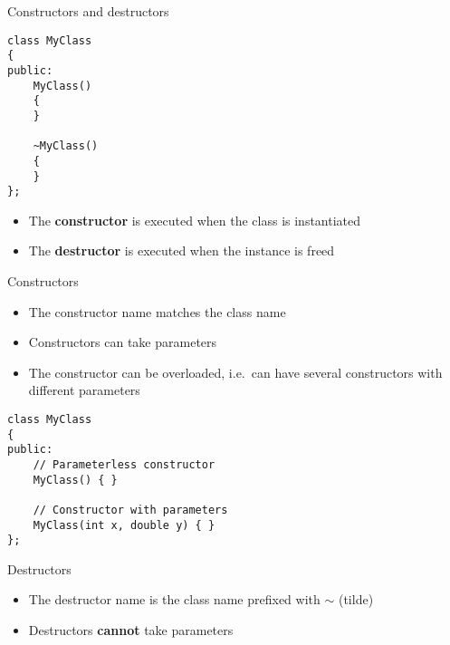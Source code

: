 \begin{frame}[fragile]{Constructors and destructors}
	\begin{lstlisting}
class MyClass
{
public:
    MyClass()
    {
    }
    
    ~MyClass()
    {
    }
};
	\end{lstlisting}
    \begin{itemize}
        \item The \textbf{constructor} is executed when the class is instantiated
        \item The \textbf{destructor} is executed when the instance is freed
    \end{itemize}
\end{frame}

\begin{frame}[fragile]{Constructors}
    \begin{itemize}
        \item The constructor name matches the class name \pause
        \item Constructors can take parameters \pause
        \item The constructor can be overloaded, i.e.\ can have several constructors with different parameters
    \end{itemize}
    \pause
	\begin{lstlisting}
class MyClass
{
public:
    // Parameterless constructor
    MyClass() { }
    
    // Constructor with parameters
    MyClass(int x, double y) { }
};
	\end{lstlisting}
\end{frame}

\begin{frame}[fragile]{Destructors}
    \begin{itemize}
        \item The destructor name is the class name prefixed with $\sim$ (tilde) \pause
        \item Destructors \textbf{cannot} take parameters
    \end{itemize}
\end{frame}

